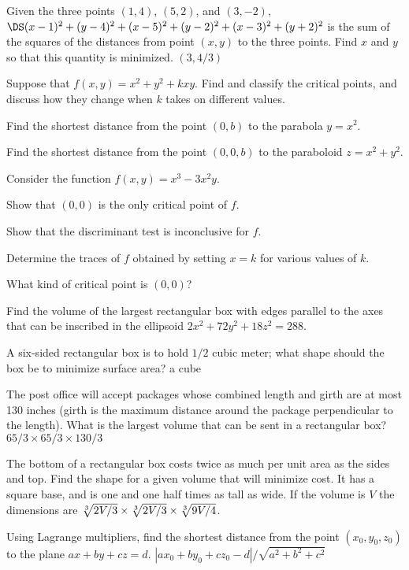 \problem Given the three points $(1,4)$, $(5,2)$, and $(3,-2)$,
$\DS(x-1)^2+(y-4)^2+(x-5)^2+(y-2)^2+(x-3)^2+(y+2)^2$ is the sum of the
squares of the distances from point $(x,y)$ to the three points. Find $x$
and $y$ so that this quantity is minimized. 
\answer  $(3,4/3)$
\endanswer

\problem Suppose that $f(x,y)=x^2+y^2+kxy$. Find and classify the critical
points, and discuss how they change when $k$ takes on different values.

\problem Find the shortest distance from the point $(0,b)$ to the parabola
$y=x^2$.

\problem Find the shortest distance from the point $(0,0,b)$ to the
paraboloid $z=x^2+y^2$.

\problem Consider the function $f(x,y)=x^3-3x^2y$.

\subprob Show that $(0,0)$ is the only critical point of $f$.

\subprob Show that the discriminant test is inconclusive for $f$.

\subprob Determine the traces of $f$ obtained by setting $x=k$ for various
values of $k$.

\subprob What kind of critical point is $(0,0)$?


\problem Find the volume of the largest rectangular box with edges parallel
to the axes that can be inscribed in the ellipsoid $2x^2+72y^2+18z^2=288$.





\problem A six-sided rectangular box is to hold $1/2$ cubic meter; what
shape should the box be to minimize surface area? 
\answer  a cube
\endanswer

\problem The post office will accept packages whose combined length and
girth are at most 130 inches (girth is the maximum distance around the
package perpendicular to the length). What is the largest volume that can
be sent in a rectangular box? 
\answer  $65/3\times 65/3\times 130/3$
\endanswer

\problem The bottom of a rectangular box costs twice as much per unit area
as the sides and top. Find the shape for a given volume that will minimize
cost. 
\answer  It has a square base, and is one and one half times as tall
as wide.  If the volume is $V$ the dimensions are $\root 3 \of {2V/3}\times
\root 3 \of {2V/3}\times \root 3\of {9V/4}$.
\endanswer

\problem Using Lagrange multipliers, find the shortest distance from the
point $(x_0,y_0,z_0)$ to the plane $ax+by+cz=d$. 
\answer 
$|ax_0+by_0+cz_0-d|/\sqrt{a^2+b^2+c^2}$
\endanswer

